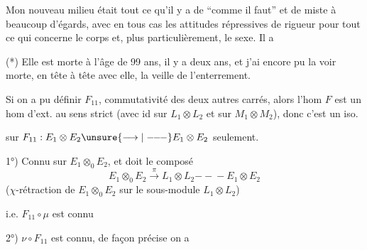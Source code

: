 Mon nouveau milieu était tout ce qu'il y a de ``comme il faut'' et de \newline
miste à beaucoup d'égards, avec en tous cas les attitudes répressives de rigueur
pour tout ce qui concerne le corps et, plus particulièrement, le sexe. Il a 

(*) Elle est morte à l'âge de 99 ans, il y a deux ans, et j'ai encore pu la voir
morte, en tête à tête avec elle, la veille de l'enterrement.


Si on a pu définir $F_{11}$,  commutativité des deux autres carrés, alors l'hom $F$ est un hom d'ext. au sens strict (avec id sur $L_1\otimes L_2$ et sur $M_1\otimes M_2$), donc c'est un iso.

 sur $F_{11}:E_1\otimes E_2\unsure{\longrightarrow|\mathrel{-\!\!-\!\!-}}E_1\otimes E_2$ seulement.

1°) Connu sur $E_1\otimes_0 E_2$, et doit  le composé
\[
 E_1\otimes_0 E_2\xrightarrow{\pi}L_1\otimes L_2\mathrel{-\!\!-\!\!-}E_1\otimes E_2
\]
($\chi$-rétraction de $E_1\otimes_0 E_2$ sur le sous-module $L_1\otimes L_2$)

i.e. $F_{11}\circ\mu$ est connu

2°) $\nu\circ F_{11}$ est connu, de façon précise on a




